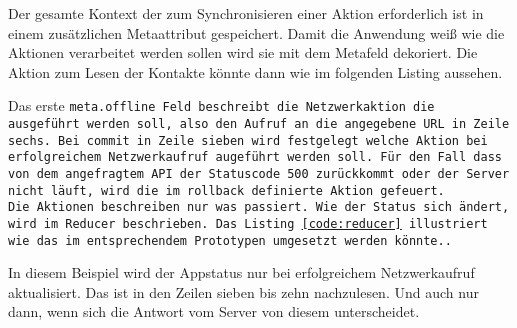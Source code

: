 Der gesamte Kontext der zum Synchronisieren einer Aktion erforderlich ist in einem zusätzlichen Metaattribut gespeichert. Damit die Anwendung weiß wie die Aktionen verarbeitet werden sollen wird sie mit dem Metafeld dekoriert. Die Aktion zum Lesen der Kontakte könnte dann wie im folgenden Listing aussehen.
\begin{center}
  
\end{center}
Das erste \tt{meta.offline} Feld beschreibt die Netzwerkaktion die ausgeführt werden soll, also den Aufruf an die angegebene URL in Zeile sechs. Bei \tt{commit} in Zeile sieben wird festgelegt welche Aktion bei erfolgreichem Netzwerkaufruf augeführt werden soll. Für den Fall dass von dem angefragtem \gls{API} der Statuscode 500 zurückkommt oder der Server nicht läuft, wird die im \tt{rollback} definierte Aktion gefeuert.\\
Die Aktionen beschreiben nur was passiert. Wie der Status sich ändert, wird im \tt{Reducer} beschrieben. Das Listing \ref{code:reducer} illustriert wie das im entsprechendem Prototypen umgesetzt werden könnte..
\begin{center}
  
\end{center}
In diesem Beispiel wird der Appstatus nur bei erfolgreichem Netzwerkaufruf aktualisiert. Das ist in den Zeilen sieben bis zehn nachzulesen. Und auch nur dann, wenn sich die Antwort vom Server von diesem unterscheidet.